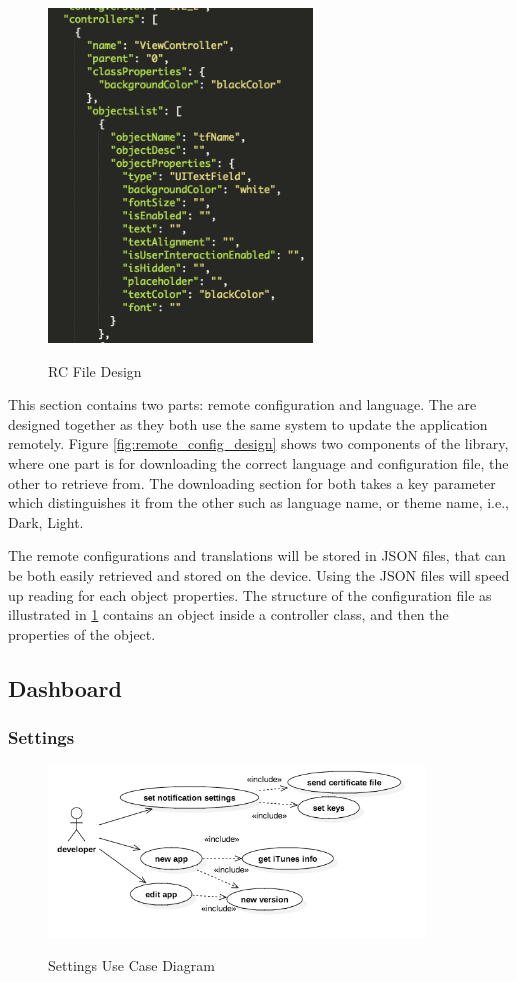\begin{figure}[!h]
    \caption{RC File Design}
    \centering
    \includegraphics[width=70mm]{images/design/rc_file}
    \label{fig:rc_file_design}
\end{figure}

This section contains two parts: remote configuration and language. The are designed together as they both use the same system to update the application remotely. Figure \ref{fig:remote_config_design} shows two components of the library, where one part is for downloading the correct language and configuration file, the other to retrieve from. The downloading section for both takes a key parameter which distinguishes it from the other such as language name, or theme name, i.e., Dark, Light.  

The remote configurations and translations will be stored in JSON files, that can be both easily retrieved and stored on the device. Using the JSON files will speed up reading for each object properties. The structure of the configuration file as illustrated in \ref{fig:rc_file_design} contains an object inside a controller class, and then the properties of the object.

\subsection{Dashboard}

\subsubsection{Settings} \label{d-db:settings}

\begin{figure}[!h]
    \caption{Settings Use Case Diagram}
    \centering
    \includegraphics[width=100mm]{images/use_cases/settings_uc}
    \label{fig:settings_uc}
\end{figure}

